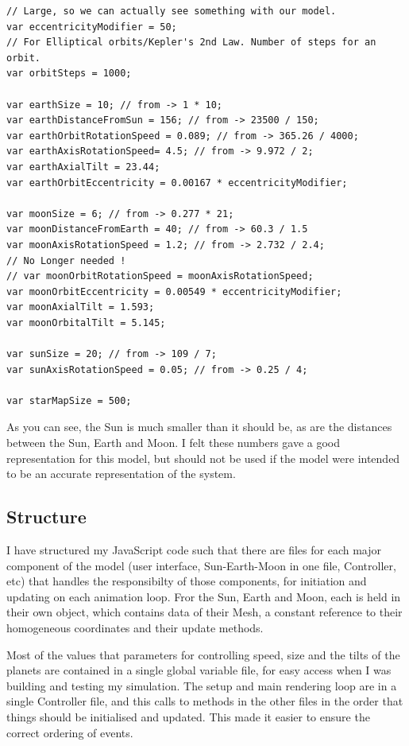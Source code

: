 \documentclass[12pt]{article}
\begin{document}
\begin{lstlisting}
// Large, so we can actually see something with our model.
var eccentricityModifier = 50; 
// For Elliptical orbits/Kepler's 2nd Law. Number of steps for an orbit.
var orbitSteps = 1000;

var earthSize = 10; // from -> 1 * 10; 
var earthDistanceFromSun = 156; // from -> 23500 / 150; 
var earthOrbitRotationSpeed = 0.089; // from -> 365.26 / 4000; 
var earthAxisRotationSpeed= 4.5; // from -> 9.972 / 2; 
var earthAxialTilt = 23.44;
var earthOrbitEccentricity = 0.00167 * eccentricityModifier;

var moonSize = 6; // from -> 0.277 * 21;
var moonDistanceFromEarth = 40; // from -> 60.3 / 1.5
var moonAxisRotationSpeed = 1.2; // from -> 2.732 / 2.4;
// No Longer needed !
// var moonOrbitRotationSpeed = moonAxisRotationSpeed;
var moonOrbitEccentricity = 0.00549 * eccentricityModifier;
var moonAxialTilt = 1.593;
var moonOrbitalTilt = 5.145;

var sunSize = 20; // from -> 109 / 7;
var sunAxisRotationSpeed = 0.05; // from -> 0.25 / 4;

var starMapSize = 500;
\end{lstlisting}

As you can see, the Sun is much smaller than it should be, as are the distances between the Sun, Earth and Moon. I felt these numbers gave a good representation for this model, but should not be used if the model were intended to be an accurate representation of the system.

\subsection{Structure}
I have structured my JavaScript code such that there are files for each major component of the model (user interface, Sun-Earth-Moon in one file, Controller, etc) that handles the responsibilty of those components, for initiation and updating on each animation loop. Fror the Sun, Earth and Moon, each is held in their own object, which contains data of their Mesh, a constant reference to their homogeneous coordinates and their update methods.

Most of the values that parameters for controlling speed, size and the tilts of the planets are contained in a single global variable file, for easy access when I was building and testing my simulation. The setup and main rendering loop are in a single Controller file, and this calls to methods in the other files in the order that things should be initialised and updated. This made it easier to ensure the correct ordering of events.
\end{document}
